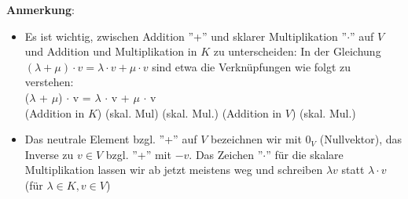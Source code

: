 \documentclass[10pt,a4paper,numbers=endperiod]{scrartcl}
\theoremstyle{definition}
\begin{document}
\textbf{Anmerkung}: \begin{itemize}
	\item Es ist wichtig, zwischen Addition ''+'' und sklarer Multiplikation ''$\cdot$'' auf $V$ und Addition und Multiplikation in $K$ zu unterscheiden: In der Gleichung $(\lambda + \mu) \cdot v = \lambda \cdot v + \mu\cdot v$ sind etwa die Verknüpfungen wie folgt zu verstehen:\\
	($\lambda$ \hspace*{5mm}+ \hspace*{5mm}$\mu$) \hspace*{5mm} $\cdot$ \hspace*{5mm} v \hspace*{0,5mm} = $\lambda$ \hspace*{2mm} $\cdot$ \hspace*{2mm} v \hspace*{11mm}+ \hspace*{12mm} $\mu$ \hspace*{4mm}$\cdot$\hspace*{4mm} v  \\
	(Addition in $K$) (skal. Mul) (skal. Mul.) (Addition in $V$) (skal. Mul.)
	\item Das neutrale Element bzgl. ''+'' auf $V$ bezeichnen wir mit $0_V$ (Nullvektor), das Inverse zu $v \in V$ bzgl. ''+'' mit $-v$. Das Zeichen ''$\cdot$'' für die skalare Multiplikation lassen wir ab jetzt meistens weg und schreiben $\lambda v$ statt $\lambda \cdot v$ (für $\lambda \in K, v \in V$)
\end{itemize}
\newpage
\end{document}
